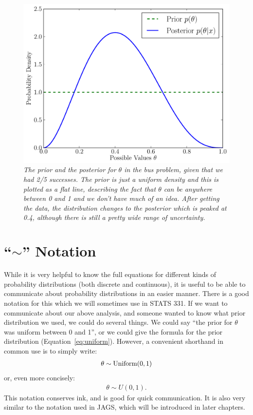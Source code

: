 \begin{figure}[ht!]
\begin{center}
\includegraphics[scale=0.6]{Figures/bus_inference.pdf}
\caption{\it The prior and the posterior for $\theta$ in the bus problem, given
that we had 2/5 successes. The prior is just a uniform density and this is
plotted as a flat line, describing the fact that $\theta$ can be anywhere between
0 and 1 and we don't have much of an idea. After getting the data, the distribution
changes to the posterior which is peaked at 0.4, although there is still a pretty
wide range of uncertainty.\label{fig:bus_inference}}
\end{center}
\end{figure}

\section{``$\sim$'' Notation}
While it is very helpful to know the full equations for different kinds of
probability distributions (both discrete and continuous), it is
useful to be able to communicate about probability distributions in an
easier manner. There is a good notation for this which we will sometimes use
in STATS 331. If we want to communicate about our above analysis, and someone
wanted to know what prior distribution we used, we could do several things.
We could say ``the prior for $\theta$
was uniform between 0 and 1'', or we could give the formula for the prior distribution
(Equation~\ref{eq:uniform}). However, a convenient shorthand in common use is
to simply write:
\begin{eqnarray}
\theta \sim \textnormal{Uniform}(0, 1)
\end{eqnarray}
or, even more concisely:
\begin{eqnarray}
\theta \sim U(0, 1).
\end{eqnarray}
This notation conserves ink, and is good for quick communication.
It is also
very similar to the notation used in JAGS, which will be introduced in later
chapters.

